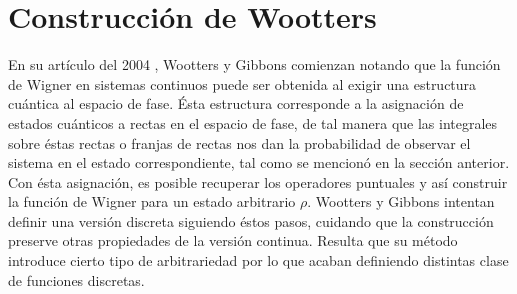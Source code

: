 \documentclass[a4paper,11pt]{report}
\DeclareMathOperator{\Z}{\mathbb{Z}}
\begin{document}




  \section{Construcción de Wootters}

  En su artículo del 2004 \cite{gibbons2004}, Wootters y
  Gibbons comienzan notando que la función de Wigner en
  sistemas continuos puede ser obtenida al exigir una
  estructura cuántica al espacio de fase. Ésta estructura
  corresponde a la asignación de estados cuánticos a rectas
  en el espacio de fase, de tal manera que las integrales
  sobre éstas rectas o franjas de rectas nos dan la
  probabilidad de observar el sistema en el estado
  correspondiente, tal como se mencionó en la sección
  anterior. Con ésta asignación, es posible recuperar los
  operadores puntuales y así construir la función de Wigner
  para un estado arbitrario $\rho$.  Wootters y Gibbons
  intentan definir una versión discreta siguiendo éstos
  pasos, cuidando que la construcción preserve otras
  propiedades de la versión continua.  Resulta que su método
  introduce cierto tipo de arbitrariedad por lo que acaban
  definiendo distintas clase de funciones discretas.
\end{document}
